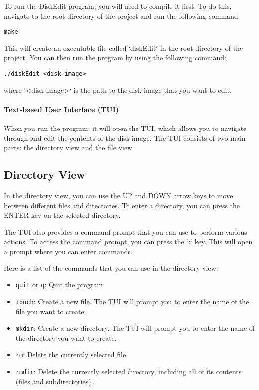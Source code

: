 \documentclass{article}
\begin{document}
To run the DiskEdit program, you will need to compile it first. To do this, navigate to the root directory of the project and run the following command:

\begin{lstlisting}[style=terminal]
make
\end{lstlisting}

This will create an executable file called `diskEdit` in the root directory of the project. You can then run the program by using the following command:

\begin{lstlisting}[style=terminal]
./diskEdit <disk image>
\end{lstlisting}

where `\textless disk image\textgreater` is the path to the disk image that you want to edit.

\paragraph{Text-based User Interface (TUI)}

When you run the program, it will open the TUI, which allows you to navigate through and edit the contents of the disk image. The TUI consists of two main parts: the directory view and the file view.

\subsection{Directory View}

In the directory view, you can use the UP and DOWN arrow keys to move between different files and directories. To enter a directory, you can press the ENTER key on the selected directory.

The TUI also provides a command prompt that you can use to perform various actions. To access the command prompt, you can press the `:` key. This will open a prompt where you can enter commands.

Here is a list of the commands that you can use in the directory view:

\begin{itemize}
    \item \texttt{quit} or \texttt{q}: Quit the program
    \item \texttt{touch}: Create a new file. The TUI will prompt you to enter the name of the file you want to create.
    \item \texttt{mkdir}: Create a new directory. The TUI will prompt you to enter the name of the directory you want to create.
    \item \texttt{rm}: Delete the currently selected file.
    \item \texttt{rmdir}: Delete the currently selected directory, including all of its contents (files and subdirectories).
\end{itemize}
\end{document}
